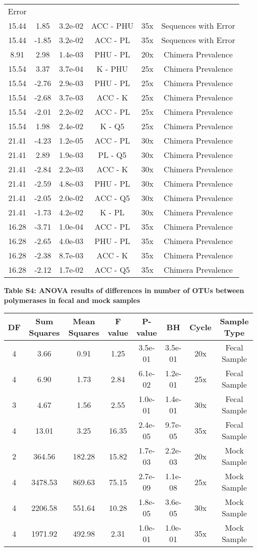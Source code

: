 \documentclass[11pt,]{article}
\begin{document}
\begin{longtable}[]{@{}cccccc@{}}
Error\tabularnewline
15.44 & 1.85 & 3.2e-02 & ACC - PHU & 35x & Sequences with
Error\tabularnewline
15.44 & -1.85 & 3.2e-02 & ACC - PL & 35x & Sequences with
Error\tabularnewline
8.91 & 2.98 & 1.4e-03 & PHU - PL & 20x & Chimera
Prevalence\tabularnewline
15.54 & 3.37 & 3.7e-04 & K - PHU & 25x & Chimera
Prevalence\tabularnewline
15.54 & -2.76 & 2.9e-03 & PHU - PL & 25x & Chimera
Prevalence\tabularnewline
15.54 & -2.68 & 3.7e-03 & ACC - K & 25x & Chimera
Prevalence\tabularnewline
15.54 & -2.01 & 2.2e-02 & ACC - PL & 25x & Chimera
Prevalence\tabularnewline
15.54 & 1.98 & 2.4e-02 & K - Q5 & 25x & Chimera
Prevalence\tabularnewline
21.41 & -4.23 & 1.2e-05 & ACC - PL & 30x & Chimera
Prevalence\tabularnewline
21.41 & 2.89 & 1.9e-03 & PL - Q5 & 30x & Chimera
Prevalence\tabularnewline
21.41 & -2.84 & 2.2e-03 & ACC - K & 30x & Chimera
Prevalence\tabularnewline
21.41 & -2.59 & 4.8e-03 & PHU - PL & 30x & Chimera
Prevalence\tabularnewline
21.41 & -2.05 & 2.0e-02 & ACC - Q5 & 30x & Chimera
Prevalence\tabularnewline
21.41 & -1.73 & 4.2e-02 & K - PL & 30x & Chimera
Prevalence\tabularnewline
16.28 & -3.71 & 1.0e-04 & ACC - PL & 35x & Chimera
Prevalence\tabularnewline
16.28 & -2.65 & 4.0e-03 & PHU - PL & 35x & Chimera
Prevalence\tabularnewline
16.28 & -2.38 & 8.7e-03 & ACC - K & 35x & Chimera
Prevalence\tabularnewline
16.28 & -2.12 & 1.7e-02 & ACC - Q5 & 35x & Chimera
Prevalence\tabularnewline
\bottomrule
\end{longtable}

\newpage

\textbf{Table S4: ANOVA results of differences in number of OTUs between
polymerases in fecal and mock samples}

\begin{longtable}[]{@{}cccccccc@{}}
\toprule
DF & Sum Squares & Mean Squares & F value & P-value & BH & Cycle &
Sample Type\tabularnewline
\midrule
\endhead
4 & 3.66 & 0.91 & 1.25 & 3.5e-01 & 3.5e-01 & 20x & Fecal
Sample\tabularnewline
4 & 6.90 & 1.73 & 2.84 & 6.1e-02 & 1.2e-01 & 25x & Fecal
Sample\tabularnewline
3 & 4.67 & 1.56 & 2.55 & 1.0e-01 & 1.4e-01 & 30x & Fecal
Sample\tabularnewline
4 & 13.01 & 3.25 & 16.35 & 2.4e-05 & 9.7e-05 & 35x & Fecal
Sample\tabularnewline
2 & 364.56 & 182.28 & 15.82 & 1.7e-03 & 2.2e-03 & 20x & Mock
Sample\tabularnewline
4 & 3478.53 & 869.63 & 75.15 & 2.7e-09 & 1.1e-08 & 25x & Mock
Sample\tabularnewline
4 & 2206.58 & 551.64 & 10.28 & 1.8e-05 & 3.6e-05 & 30x & Mock
Sample\tabularnewline
4 & 1971.92 & 492.98 & 2.31 & 1.0e-01 & 1.0e-01 & 35x & Mock
Sample\tabularnewline
\bottomrule
\end{longtable}
\end{document}
